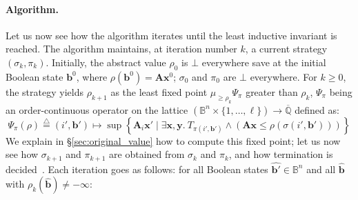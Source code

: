 \documentclass{llncs}
\newcommand{\pponly}[1]{}
\newcommand{\BB}{\mathbb{B}}
\newcommand{\QQ}{\mathbb{Q}}
\newcommand{\instance}[1]{\hat{#1}}
\newcommand{\defn}{\stackrel{\triangle}{=}}
\newcommand{\mat}[1]{{\boldsymbol #1}}
\renewcommand{\vec}[1]{{\boldsymbol #1}}
\begin{document}
\paragraph*{Algorithm.}
Let us now see how the algorithm iterates until the least inductive
invariant is reached.
The algorithm maintains, at iteration number $k$, a current strategy
$(\sigma_k,\pi_k)$.  Initially, the abstract value $\rho_0$ is $\bot$
everywhere save at the initial Boolean state $\vec{b}^0$, where
$\rho(\vec{b}^0)=\mat{A}\vec{x}^0$; $\sigma_0$ and $\pi_0$ are $\bot$
everywhere. For $k \geq 0$, the strategy yields $\rho_{k+1}$ as the
least fixed point $\mu_{\geq \rho_k} \Psi_{\pi}$ greater than
$\rho_k$, $\Psi_{\pi}$ being an order-continuous operator on the
lattice $(\BB^n \times \{ 1, \dots, \ell\}) \rightarrow
\overline{\QQ}$ defined as: \\[-2ex]
\begin{equation}\label{equ:transformer}
\Psi_{\pi}(\rho) \defn (i',\vec{b}') \mapsto
  \sup \left\{ \mat{A}_i \vec{x}' \mid \exists \vec{x},\vec{y}.~T_{\pi(i',\vec{b}')}
          \land (\mat{A}\vec{x} \leq \rho(\sigma(i',\vec{b}'))) \right\}
\end{equation}
We explain in \S\ref{sec:original_value} how to compute this fixed
point; let us now see how $\sigma_{k+1}$ and $\pi_{k+1}$ are obtained
from $\sigma_k$ and $\pi_k$, and how termination is
decided~\cite[\S6.5]{Gawlitza_Monniaux_LMCS12}.  Each iteration goes
as follows: for all Boolean states $\instance{\vec{b}'} \in\BB^n$ and
all $\instance{\vec{b}}$ with $\rho_k(\instance{\vec{b}})\neq-\vec{\infty}$:\pponly{\\[-3ex]}
\end{document}
